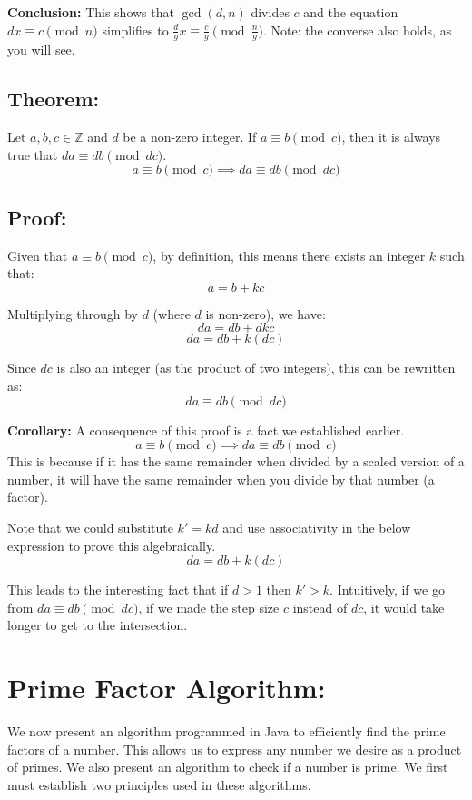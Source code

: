 \documentclass{article}
\begin{document}
\textbf{Conclusion:}
This shows that \( \gcd(d, n) \) divides \( c \) and the equation \( dx \equiv c \pmod{n} \) simplifies to \( \frac{d}{g}x \equiv \frac{c}{g} \pmod{\frac{n}{g}} \). 
Note: the converse also holds, as you will see.

\subsection*{Theorem:}

Let \( a, b, c \in \mathbb{Z} \) and \( d \) be a non-zero integer. If \( a \equiv b \pmod{c} \), then it is always true that \( da \equiv db \pmod{dc} \).
\[ a \equiv b \pmod{c} \implies da \equiv db \pmod{dc} \]

\subsection*{Proof:}
Given that \( a \equiv b \pmod{c} \), by definition, this means there exists an integer \( k \) such that:
\[ a = b + kc \]

Multiplying through by \( d \) (where \( d \) is non-zero), we have:
\[ da = db + dkc \]
\[ da = db + k(dc) \]

Since \( dc \) is also an integer (as the product of two integers), this can be rewritten as:
\[ da \equiv db \pmod{dc} \]

\textbf{Corollary:} A consequence of this proof is a fact we established earlier.  \[ a \equiv b \pmod{c} \implies da \equiv db \pmod{c} \]
This is because if it has the same remainder when divided by a scaled version of a number, it will have the same remainder when you divide by that number (a factor). 

Note that we could substitute $k' = kd$ and use associativity in the below expression to prove this algebraically. \[ da = db + k(dc) \] 

This leads to the interesting fact that if $d > 1$ then $k' > k$. Intuitively, if we go from $da \equiv db \pmod{dc}$, if we made the step size $c$ instead of $dc$, it would take longer to get to the intersection.





\section*{Prime Factor Algorithm:}
We now present an algorithm programmed in Java to efficiently find the prime factors of a number. This allows us to express any number we desire as a product of primes. We also present an algorithm to check if a number is prime. 
We first must establish two principles used in these algorithms. 
\end{document}
